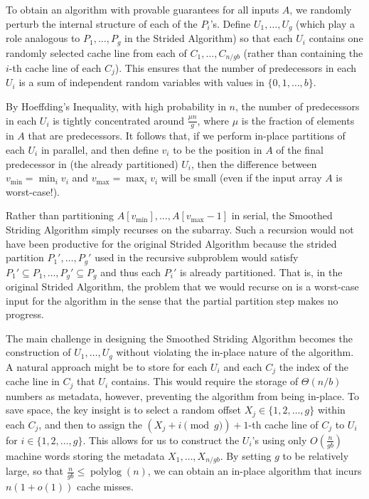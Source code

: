 \documentclass[11pt]{article}
\renewcommand{\paragraph}[1]{\vspace{0.09in}\noindent{\bf \boldmath #1.}}
\theoremstyle{remark}
\theoremstyle{remark}
\begin{document}
\paragraph{The Smoothed Striding Algorithm Description}
To obtain an algorithm with provable guarantees for all inputs $A$, we
randomly perturb the internal structure of each of the $P_i$'s. Define
$U_1, \ldots, U_{g}$ (which play a role analogous to $P_1,
\ldots, P_g$ in the Strided Algorithm) so that each $U_i$ contains one
randomly selected cache line from each of $C_1, \ldots, C_{n /
  gb}$ (rather than containing the $i$-th cache line of each
$C_j$). This ensures that the number of predecessors in each $U_i$ is
a sum of independent random variables with values in $\{0, 1, \ldots,
b\}$.


By Hoeffding's Inequality, with high probability in $n$, the number of
predecessors in each $U_i$ is tightly concentrated around $\frac{\mu
  n}{g}$, where $\mu$ is the fraction of elements in $A$ that are
predecessors. It follows that, if we perform in-place partitions of
each $U_i$ in parallel, and then define $v_i$ to be the position in
$A$ of the final predecessor in (the already partitioned) $U_i$, then
the difference between $v_{\text{min}} = \min_i v_i$ and
$v_{\text{max}} = \max_i v_i$ will be small (even if the input array
$A$ is worst-case!).

Rather than partitioning $A[v_{\text{min}}],\ldots,
A[v_{\text{max}}-1]$ in serial, the Smoothed Striding Algorithm simply
recurses on the subarray. Such a recursion would not have been
productive for the original Strided Algorithm because the strided
partition $P_1', \ldots, P_g'$ used in the recursive subproblem would
satisfy $P_1' \subseteq P_1, \ldots, P_g' \subseteq P_g$ and thus each
$P_i'$ is already partitioned. That is, in the original Strided
Algorithm, the problem that we would recurse on is a worst-case input
for the algorithm in the sense that the partial partition step makes
no progress.


The main challenge in designing the Smoothed Striding Algorithm
becomes the construction of $U_1, \ldots, U_{g}$ without
violating the in-place nature of the algorithm. A natural approach
might be to store for each $U_i$ and each $C_j$ the index of the cache
line in $C_j$ that $U_i$ contains. This would require the storage of
$\Theta(n / b)$ numbers as metadata, however, preventing the algorithm
from being in-place. To save space, the key insight is to select a
random offset $X_j \in \{1, 2, \ldots, g\}$ within each $C_j$, and
then to assign the $(X_j + i \pmod g) + 1$-th cache line of $C_j$ to
$U_i$ for $i \in \{1, 2, \ldots, g\}$. This allows for us to construct
the $U_i$'s using only $O\left(\frac{n}{gb}\right)$ machine words
storing the metadata $X_1, \ldots, X_{n / gb}$. By setting $g$ to
be relatively large, so that $\frac{n}{gb} \le
\operatorname{polylog}(n)$, we can obtain an in-place algorithm that
incurs $n (1 + o(1))$ cache misses.
\end{document}
